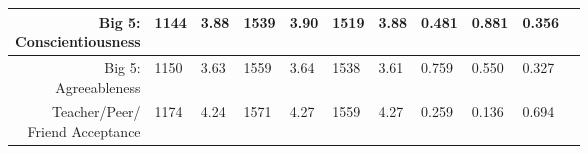 \begin{longtable}{|r|l|l|l|l|l|l|l|l|l|l}
\hline

	 \makecell{Big 5:\\ Conscientiousness}                                           & 1144                                                               &  3.88                                                              & 1539                                                               &  3.90                                                              & 1519                                                               &  3.88                                                              & 0.481                                                              & 0.881                                                              & 0.356                                                             \\

\hline

	 \makecell{Big 5:\\ Agreeableness}                                               & 1150                                                               &  3.63                                                              & 1559                                                               &  3.64                                                              & 1538                                                               &  3.61                                                              & 0.759                                                              & 0.550                                                              & 0.327                                                             \\

\hline

	\makecell{ Teacher/Peer/\\Friend Acceptance}                                     & 1174                                                               &  4.24                                                              & 1571                                                               &  4.27                                                              & 1559                                                               &  4.27                                                              & 0.259                                                              & 0.136                                                              & 0.694                                                             \\


\end{longtable}

